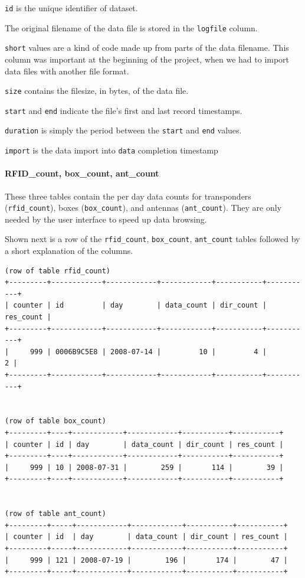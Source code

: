 \begin{mydesc}
\item \lstinline|id| is the unique identifier of dataset.
\item The original filename of the data file is stored in the \lstinline|logfile| column.
\item \lstinline|short| values are a kind of code made up from parts of the data filename. This column was important at the beginning of the project, when we had to import data files with another file format.
\item \lstinline|size| contains the filesize, in bytes, of the data file.
\item \lstinline|start| and \lstinline|end| indicate the file's first and last record timestamps.
\item \lstinline|duration| is simply the period between the \lstinline|start| and \lstinline|end| values.
\item \lstinline|import| is the data import into \lstinline|data| completion timestamp
\end{mydesc}

\paragraph{RFID\_count, box\_count, ant\_count}
\label{para:counts}

These three tables contain the per day data counts for transponders (\lstinline|rfid_count|), boxes (\lstinline|box_count|), and antennas (\lstinline|ant_count|). They are only needed by the user interface to speed up data browsing.

Shown next is a row of the \lstinline|rfid_count|, \lstinline|box_count|, \lstinline|ant_count| tables followed by a short explanation of the columns.

\codescript
{}
\begin{lstlisting}[frame=none]
(row of table rfid_count)
+---------+------------+------------+------------+-----------+-----------+
| counter | id         | day        | data_count | dir_count | res_count |
+---------+------------+------------+------------+-----------+-----------+
|     999 | 0006B9C5E8 | 2008-07-14 |         10 |         4 |         2 | 
+---------+------------+------------+------------+-----------+-----------+


(row of table box_count)
+---------+----+------------+------------+-----------+-----------+
| counter | id | day        | data_count | dir_count | res_count |
+---------+----+------------+------------+-----------+-----------+
|     999 | 10 | 2008-07-31 |        259 |       114 |        39 | 
+---------+----+------------+------------+-----------+-----------+


(row of table ant_count)
+---------+-----+------------+------------+-----------+-----------+
| counter | id  | day        | data_count | dir_count | res_count |
+---------+-----+------------+------------+-----------+-----------+
|     999 | 121 | 2008-07-19 |        196 |       174 |        47 | 
+---------+-----+------------+------------+-----------+-----------+


\end{lstlisting}


